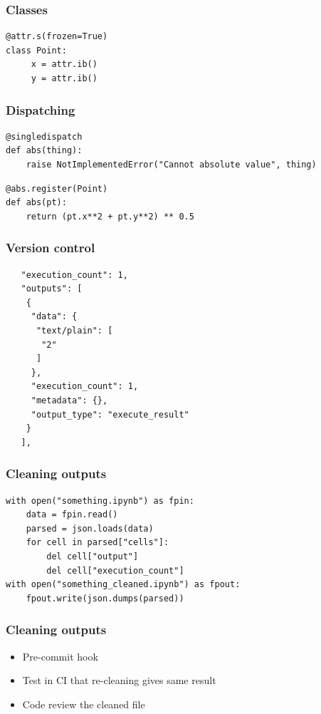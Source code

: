 \begin{frame}[fragile]
\frametitle{Classes}

\begin{lstlisting}[frame=single]
@attr.s(frozen=True)
class Point:
     x = attr.ib()
     y = attr.ib()
\end{lstlisting}


\end{frame}

\begin{frame}[fragile]
\frametitle{Dispatching}

\begin{lstlisting}[frame=single]
@singledispatch
def abs(thing):
    raise NotImplementedError("Cannot absolute value", thing)
\end{lstlisting}

\begin{lstlisting}[frame=single]
@abs.register(Point)
def abs(pt):
    return (pt.x**2 + pt.y**2) ** 0.5
\end{lstlisting}

\end{frame}

\begin{frame}[fragile]
\frametitle{Version control}

\begin{lstlisting}
   "execution_count": 1,
   "outputs": [
    {
     "data": {
      "text/plain": [
       "2"
      ]
     },
     "execution_count": 1,
     "metadata": {},
     "output_type": "execute_result"
    }
   ],
\end{lstlisting}

\end{frame}

\begin{frame}[fragile]
\frametitle{Cleaning outputs}

\begin{lstlisting}
with open("something.ipynb") as fpin:
    data = fpin.read()
    parsed = json.loads(data)
    for cell in parsed["cells"]:
        del cell["output"]
        del cell["execution_count"]
with open("something_cleaned.ipynb") as fpout:
    fpout.write(json.dumps(parsed))
\end{lstlisting}

\end{frame}

\begin{frame}
\frametitle{Cleaning outputs}

\begin{itemize}
\item Pre-commit hook
\item Test in CI that re-cleaning gives same result
\item Code review the cleaned file
\end{itemize}

\end{frame}


